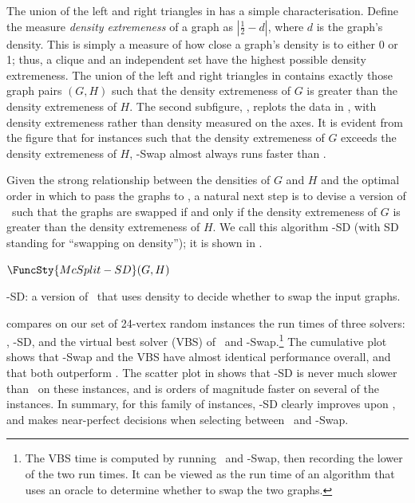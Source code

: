 The union of the left and right triangles in
 has a simple characterisation.
Define the measure \emph{density extremeness} of
a graph as $\left|\frac{1}{2} - d\right|$, where $d$ is the graph's
density.  This is simply a measure of how close a graph's
density is to either 0 or 1; thus, a clique and an independent set
have the highest possible density extremeness.  The union of the left and right triangles
in  contains exactly those
graph pairs $(G,H)$ such that the density extremeness of $G$ is greater than
the density extremeness of $H$.
The second subfigure, ,
replots the data in ,
with density extremeness rather than density measured on the axes.
It is evident from the figure that for instances such that the density extremeness of $G$
exceeds the density extremeness of $H$, \McSplit-Swap almost always
runs faster than \McSplit.

Given the strong relationship between the densities of $G$ and $H$ and the 
optimal order in which to pass the graphs to \McSplit, a natural next
step is to devise a version of \McSplit\ such that the graphs are
swapped if and only if the density extremeness of $G$ is greater
than the density extremeness of $H$.  We call this algorithm
\McSplit-SD (with SD standing for ``swapping on density''); it is shown in .

\begin{algorithm}[h!]
\DontPrintSemicolon
\nl $\FuncSty{McSplit-SD}(G, H)$ \label{McSplitSDFun} \;
\nl {}
    \caption{\McSplit-SD: a version of \McSplit\ that uses density to decide whether to swap the input graphs.} 
\label{McSplitSDAlg}
\end{algorithm}

 compares on our set of 24-vertex random instances
the run times of three solvers: \McSplit, \McSplit-SD, and the virtual best solver (VBS) of
\McSplit\ and \McSplit-Swap.\footnote{The VBS time is computed by running \McSplit\ and
\McSplit-Swap, then recording the lower of the two run times.  It can be viewed as the run time
of an algorithm that uses an oracle to determine whether to swap the two graphs.}
The cumulative plot shows that \McSplit-Swap and the VBS
have almost identical performance overall, and that both outperform \McSplit.  The scatter
plot in  shows that \McSplit-SD is never much slower than
\McSplit\ on these instances, and is orders of magnitude faster on several of the
instances.  In summary, for this family of instances, \McSplit-SD clearly improves upon
\McSplit, and makes near-perfect decisions when selecting between \McSplit\ and \McSplit-Swap.


